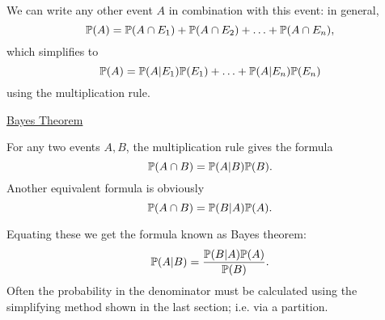 \documentclass[10pt, a4paper]{article}
\begin{document}
We can write any other event $A$ in combination with this event:
in general,
\[
\P(A) = \P(A \cap E_1) + \P(A \cap E_2) + \dotsc + \P(A \cap E_n),
\]
which simplifies to
\[
\P(A) = \P(A | E_1)\P(E_1) + \dotsc + \P(A | E_n)\P(E_n)
\]
using the multiplication rule.

\underline{Bayes Theorem}

For any two events $A, B$,
the multiplication rule gives the formula
\[
\P(A \cap B) = \P(A | B)\P(B).
\]
Another equivalent formula is obviously
\[
\P(A \cap B) = \P(B | A)\P(A).
\]

Equating these we get the formula known as Bayes theorem:
\[
\P(A | B) = \frac{\P(B | A)\P(A)}{\P(B)}.
\]
Often the probability in the denominator must be calculated using the simplifying method shown in the last section;
i.e. via a partition.
\end{document}
